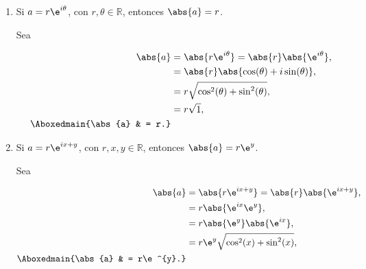 \documentclass[./../main.tex]{subfiles}
\begin{document}
\begin{problema}[15]
\begin{enumerate}
		\item Si \(a = r\e^{i\theta}\), con \(r, \theta \in \mathbb{R}\), entonces \(\abs{a} = r\).

		      \startsolution

		      Sea

		      \begin{align*}
			      \abs{a}             & = \abs{r\e^{i\theta}} = \abs{r}\abs{\e^{i\theta}}, \\
			                          & = \abs{r}\abs{\cos(\theta) + i\sin(\theta)},       \\
			                          & = r\sqrt{\cos^{2}(\theta) + \sin^{2}(\theta)},     \\
			                          & = r\sqrt{1},                                       \\
			      \Aboxedmain{\abs{a} & = r.}
		      \end{align*}

		\item Si \(a = r\e^{ix + y}\), con \(r, x, y \in \mathbb{R}\), entonces \(\abs{a} = r\e^{y}\).

		      \startsolution

		      Sea

		      \begin{align*}
			      \abs{a}             & = \abs{r\e^{ix + y}} = \abs{r}\abs{\e^{ix + y}}, \\
			                          & = r\abs{\e^{ix}\e^{y}},                          \\
			                          & = r\abs{\e^{y}}\abs{\e^{ix}},                    \\
			                          & = r\e^{y}\sqrt{\cos^{2}(x) + \sin^{2}(x)},       \\
			      \Aboxedmain{\abs{a} & = r\e^{y}.}
		      \end{align*}
	\end{enumerate}
\end{problema}
\end{document}
